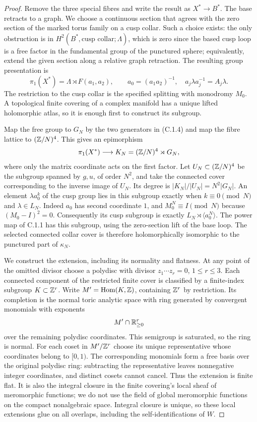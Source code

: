 \begin{proof}
Remove the three special fibres and write the result as $X^*\to B^*$.
The base retracts to a graph. We choose a continuous section that agrees
with the zero section of the marked torus family on a cusp collar.
Such a choice exists: the only obstruction is in
$H^2(B^*,\text{cusp collar};\Lambda)$, which is zero since the based
cusp loop is a free factor in the fundamental group of the punctured
sphere; equivalently, extend the given section along a relative graph
retraction. The resulting group presentation is
\[
 \pi_1(X^*)=\Lambda\rtimes F(a_1,a_2),\qquad
 a_0=(a_1a_2)^{-1},\quad a_j\lambda a_j^{-1}=A_j\lambda.
\]
The restriction to the cusp collar is the specified splitting with
monodromy $M_0$. A topological finite covering of a complex manifold
has a unique lifted holomorphic atlas, so it is enough first to
construct its subgroup.

Map the free group to $G_N$ by the two generators in (C.1.4) and
map the fibre lattice to $(\mathbb Z/N)^4$. This gives an epimorphism
\[
 \pi_1(X^*)\longrightarrow
 K_N=(\mathbb Z/N)^4\rtimes G_N,
\]
where only the matrix coordinate acts on the first factor. Let
$U_N\subset(\mathbb Z/N)^4$ be the subgroup spanned by $g,u$, of order
$N^2$, and take the connected cover corresponding to the inverse
image of $U_N$. Its degree is $|K_N|/|U_N|=N^2|G_N|$.
An element $\lambda a_0^k$ of the cusp group lies in this subgroup
exactly when $k\equiv0\pmod N$ and
$\lambda\in L_N$. Indeed $a_0$ has second coordinate $1$, and
$M_0^N\equiv I\pmod N$ because $(M_0-I)^2=0$.
Consequently its cusp subgroup is exactly
$L_N\rtimes\langle a_0^N\rangle$. The power map of C.1.1 has
this subgroup, using the zero-section lift of the base loop.
The selected connected collar cover is therefore holomorphically
isomorphic to the punctured part of $\kappa_N$.

We construct the extension, including its normality and flatness.
At any point of the omitted divisor choose a polydisc with divisor
$z_1\cdots z_r=0$, $1\leq r\leq3$. Each connected component of
the restricted finite cover is classified by a finite-index subgroup
$K\subset\mathbb Z^r$. Write $M'=\operatorname{Hom}(K,\mathbb Z)$, containing
$\mathbb Z^r$ by restriction. Its completion is the normal toric analytic
space with ring generated by convergent monomials with exponents
\[
 M'\cap\mathbb R_{\geq0}^r
\]
over the remaining polydisc coordinates. This semigroup is saturated,
so the ring is normal. For each coset in $M'/\mathbb Z^r$ choose its unique
representative whose coordinates belong to $[0,1)$. The corresponding
monomials form a free basis over the original polydisc ring: subtracting
the representative leaves nonnegative integer coordinates, and distinct
cosets cannot cancel. Thus the extension is finite flat. It is also
the integral closure in the finite covering's local sheaf of meromorphic
functions; we do not use the field of global meromorphic functions on
the compact nonalgebraic space.
Integral closure is unique, so these local extensions glue on all
overlaps, including the self-identifications of $W$.


\end{proof}
